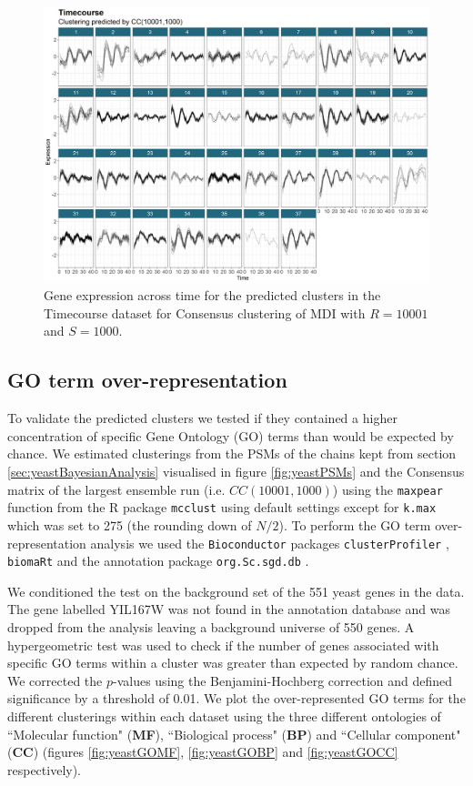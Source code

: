 \documentclass[]{article}
\begin{document}
\begin{figure}
	\centering
	\includegraphics[scale=0.6]{./Images/Yeast/TimeSeriesClusterR10001S1000.png}
	\caption{Gene expression across time for the predicted clusters in the Timecourse dataset for Consensus clustering of MDI with $R=10001$ and $S=1000$.}
	\label{fig:timecourseCCTimeSeries}
\end{figure}


\subsection{GO term over-representation} \label{sec:goTermOverRep}
To validate the predicted clusters we tested if they contained a higher concentration of specific Gene Ontology (GO) terms than would be expected by chance. We estimated clusterings from the PSMs of the chains kept from section \ref{sec:yeastBayesianAnalysis} visualised in figure \ref{fig:yeastPSMs} and the Consensus matrix of the largest ensemble run (i.e. $CC(10001, 1000)$) using the \texttt{maxpear} function from the R package \texttt{mcclust} \cite{fritsch2012mcclust} using default settings except for \texttt{k.max} which was set to 275 (the rounding down of $N/2$). To perform the GO term over-representation analysis we used the \texttt{Bioconductor} packages \texttt{clusterProfiler} \citep{yu2012clusterProfiler}, \texttt{biomaRt} \citep{durinck2009mapping} and the annotation package \texttt{org.Sc.sgd.db} \citep{carlson2014org}.

We conditioned the test on the background set of the 551 yeast genes in the data. The gene labelled YIL167W was not found in the annotation database and was dropped from the analysis leaving a background universe of 550 genes. A hypergeometric test was used to check if the number of genes associated with specific GO terms within a cluster was greater than expected by random chance. We corrected the $p$-values using the Benjamini-Hochberg correction \citep{benjamini1995controlling} and defined significance by a threshold of 0.01. We plot the over-represented GO terms for the different clusterings within each dataset using the three different ontologies of ``Molecular function" (\textbf{MF}), ``Biological process" (\textbf{BP}) and ``Cellular component" (\textbf{CC}) (figures \ref{fig:yeastGOMF}, \ref{fig:yeastGOBP} and \ref{fig:yeastGOCC} respectively). 
\end{document}
